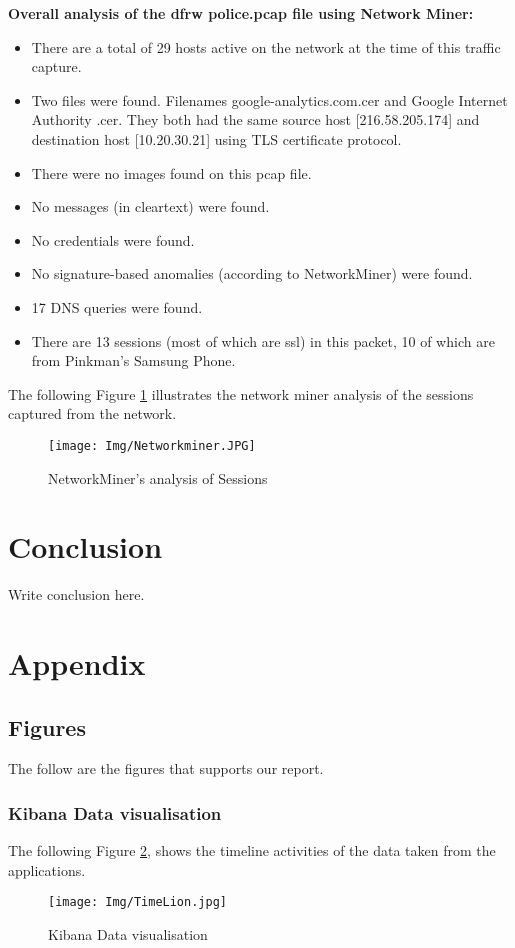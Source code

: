 \documentclass{easychair}
\begin{document}
\textbf{Overall analysis of the dfrw police.pcap file using Network Miner:}
\begin{itemize}
\item There are a total of 29 hosts active on the network at the time of this traffic capture.
\item Two files were found. Filenames google-analytics.com.cer and Google Internet Authority .cer. They both had the same source host [216.58.205.174] and destination host [10.20.30.21] using TLS certificate protocol. 
\item There were no images found on this pcap file.
\item No messages (in cleartext) were found.
\item No credentials were found.
\item No signature-based anomalies (according to NetworkMiner) were found.
\item 17 DNS queries were found.
\item There are 13 sessions (most of which are ssl) in this packet, 10 of which are from Pinkman’s Samsung Phone.
\end{itemize}

The following Figure \ref{fig:Network Miner’s analysis of Sessions} illustrates the network miner analysis of the sessions captured from the network.

\begin{figure}[H]
    \centering
    \texttt{[image: Img/Networkminer.JPG]}
    \caption{NetworkMiner’s analysis of Sessions}
    \label{fig:Network Miner’s analysis of Sessions}
\end{figure}




\section{Conclusion}
\label{sect:conclusion} Write conclusion here.


\newpage
\section{Appendix}

\subsection{Figures}
The follow are the figures that supports our report.
\subsubsection{Kibana Data visualisation}
The following Figure \ref{fig:Kibana Data visualisation}, shows the timeline activities of the data taken from the applications.
\begin{figure}[h]
    \centering
    \texttt{[image: Img/TimeLion.jpg]}
    \caption{Kibana Data visualisation}
    \label{fig:Kibana Data visualisation}
\end{figure}
\end{document}
